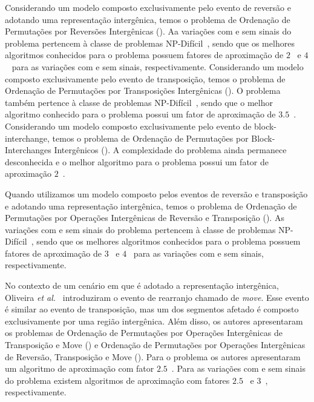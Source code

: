 Considerando um modelo composto exclusivamente pelo evento de reversão e adotando uma representação intergênica, temos o problema de Ordenação de Permutações por Reversões Intergênicas (\SbIR). Aa variações com e sem sinais do problema pertencem à classe de problemas NP-Difícil~\cite{2021b-oliveira-etal,2020a-brito-etal}, sendo que os melhores algoritmos conhecidos para o problema possuem fatores de aproximação de $2$~\cite{2021b-oliveira-etal} e $4$~\cite{2020a-brito-etal} para as variações com e sem sinais, respectivamente. Considerando um modelo composto exclusivamente pelo evento de transposição, temos o problema de Ordenação de Permutações por Transposições Intergênicas (\SbIT). O problema também pertence à classe de problemas NP-Difícil~\cite{2021a-oliveira-etal}, sendo que o melhor algoritmo conhecido para o problema possui um fator de aproximação de $3.5$~\cite{2021a-oliveira-etal}. Considerando um modelo composto exclusivamente pelo evento de block-interchange, temos o problema de Ordenação de Permutações por Block-Interchanges Intergênicos (\SbIBI). A complexidade do problema ainda permanece desconhecida e o melhor algoritmo para o problema possui um fator de aproximação $2$~\cite{2019-dias-etal}.

Quando utilizamos um modelo composto pelos eventos de reversão e transposição e adotando uma representação intergênica, temos o problema de Ordenação de Permutações por Operações Intergênicas de Reversão e Transposição (\SbIRT). As variações com e sem sinais do problema pertencem à classe de problemas NP-Difícil~\cite{2021a-oliveira-etal,2020a-brito-etal}, sendo que os melhores algoritmos conhecidos para o problema possuem fatores de aproximação de $3$~\cite{2021a-oliveira-etal} e $4$~\cite{2021b-brito-etal} para as variações com e sem sinais, respectivamente.

No contexto de um cenário em que é adotado a representação intergênica, Oliveira \textit{et al.}~\cite{2021a-oliveira-etal} introduziram o evento de rearranjo chamado de \emph{move}. Esse evento é similar ao evento de transposição, mas um dos segmentos afetado é composto exclusivamente por uma região intergênica. Além disso, os autores apresentaram os problemas de Ordenação de Permutações por Operações Intergênicas de Transposição e Move (\SbITM) e Ordenação de Permutações por Operações Intergênicas de Reversão, Transposição e Move (\SbIRTM). Para o problema \SbITM{} os autores apresentaram um algoritmo de aproximação com fator $2.5$~\cite{2021a-oliveira-etal}. Para as variações com e sem sinais do problema \SbIRTM{} existem algoritmos de aproximação com fatores $2.5$~\cite{2021a-oliveira-etal} e $3$~\cite{2021b-brito-etal}, respectivamente.  

